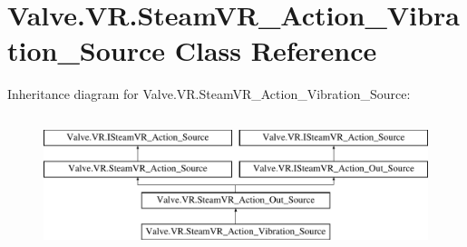 \hypertarget{class_valve_1_1_v_r_1_1_steam_v_r___action___vibration___source}{}\section{Valve.\+V\+R.\+Steam\+V\+R\+\_\+\+Action\+\_\+\+Vibration\+\_\+\+Source Class Reference}
\label{class_valve_1_1_v_r_1_1_steam_v_r___action___vibration___source}
Inheritance diagram for Valve.\+V\+R.\+Steam\+V\+R\+\_\+\+Action\+\_\+\+Vibration\+\_\+\+Source\+:\begin{figure}[H]
\begin{center}
\leavevmode
\includegraphics[height=4.000000cm]{class_valve_1_1_v_r_1_1_steam_v_r___action___vibration___source}
\end{center}
\end{figure}
